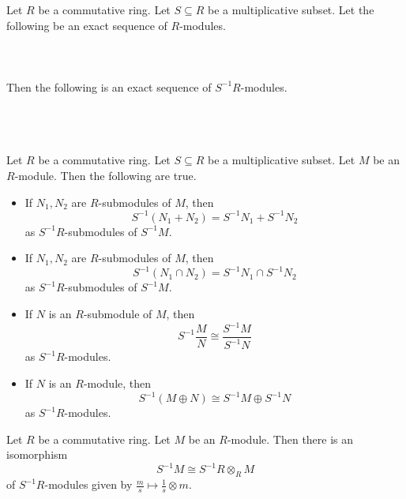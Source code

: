 \documentclass[a4paper]{article}
\begin{document}
\begin{prp}{}{} Let $R$ be a commutative ring. Let $S\subseteq R$ be a multiplicative subset. Let the following be an exact sequence of $R$-modules. \\~\\
\\~\\
Then the following is an exact sequence of $S^{-1}R$-modules. \\~\\
\\~\\
\end{prp}

\begin{crl}{}{} Let $R$ be a commutative ring. Let $S\subseteq R$ be a multiplicative subset. Let $M$ be an $R$-module. Then the following are true. 
\begin{itemize}
\item If $N_1,N_2$ are $R$-submodules of $M$, then $$S^{-1}(N_1+N_2)=S^{-1}N_1+S^{-1}N_2$$ as $S^{-1}R$-submodules of $S^{-1}M$. 
\item If $N_1,N_2$ are $R$-submodules of $M$, then $$S^{-1}(N_1\cap N_2)=S^{-1}N_1\cap S^{-1}N_2$$ as $S^{-1}R$-submodules of $S^{-1}M$. 
\item If $N$ is an $R$-submodule of $M$, then $$S^{-1}\frac{M}{N}\cong\frac{S^{-1}M}{S^{-1}N}$$ as $S^{-1}R$-modules. 
\item If $N$ is an $R$-module, then $$S^{-1}(M\oplus N)\cong S^{-1}M\oplus S^{-1}N$$ as $S^{-1}R$-modules. 
\end{itemize}
\end{crl}

\begin{prp}{}{} Let $R$ be a commutative ring. Let $M$ be an $R$-module. Then there is an isomorphism $$S^{-1}M\cong S^{-1}R\otimes_RM$$ of $S^{-1}R$-modules given by $\frac{m}{s}\mapsto\frac{1}{s}\otimes m$. 
\end{prp}
\end{document}
